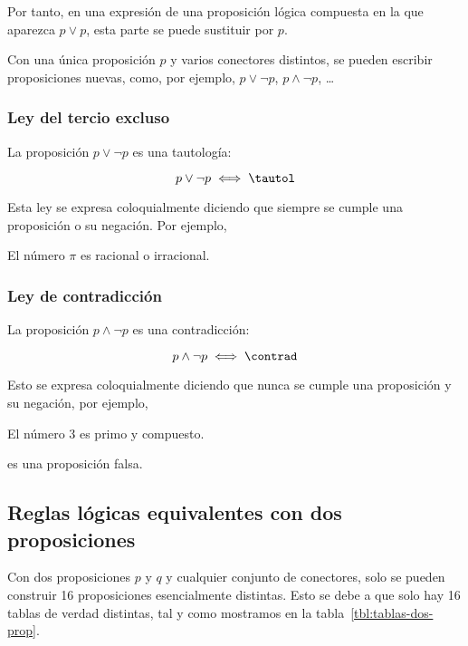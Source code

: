 \noindent Por tanto, en una expresión de una proposición lógica compuesta en
la que aparezca $p \lor p$, esta parte se puede sustituir por $p$.

Con una única proposición $p$ y varios conectores distintos, se pueden
escribir proposiciones nuevas, como, por ejemplo, $p \lor \neg p$, $p \land
\neg p$, \ldots





\subsubsection{Ley del tercio excluso}

La proposición $p \lor \neg p$ es una tautología:

$$ p \lor \neg p \iff \tautol $$

Esta ley se expresa coloquialmente diciendo que siempre se cumple una
proposición o su negación. Por ejemplo,

\begin{center}
  El número $\pi$ es racional o irracional.
\end{center}





\subsubsection{Ley de contradicción}

La proposición $p \land \neg p$ es una contradicción:

$$ p \land \neg p \iff \contrad $$

Esto se expresa coloquialmente diciendo que nunca se cumple una proposición
y su negación, por ejemplo,

\begin{center}
  El número 3 es primo y compuesto.
\end{center}

\noindent es una proposición falsa.






\subsection{Reglas lógicas equivalentes con dos proposiciones}

Con dos proposiciones $p$ y $q$ y cualquier conjunto de conectores, solo se
pueden construir 16 proposiciones esencialmente distintas. Esto se debe a
que solo hay 16 tablas de verdad distintas, tal y como mostramos en la
tabla~\ref{tbl:tablas-dos-prop}.

